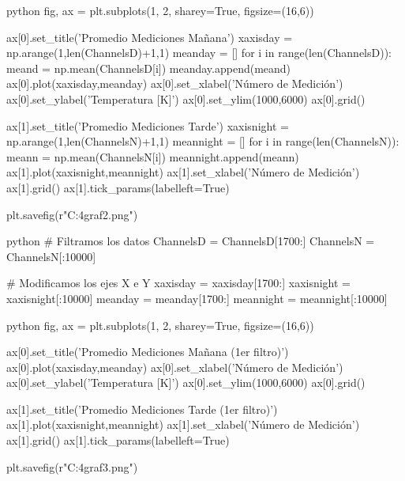 \begin{sourcecode}[\label{codigo-python}]{python}
fig, ax = plt.subplots(1, 2, sharey=True, figsize=(16,6))

ax[0].set_title('Promedio Mediciones Mañana')
xaxisday = np.arange(1,len(ChannelsD)+1,1)
meanday = []
for i in range(len(ChannelsD)):
    meand = np.mean(ChannelsD[i])
    meanday.append(meand)
ax[0].plot(xaxisday,meanday)
ax[0].set_xlabel('Número de Medición')
ax[0].set_ylabel('Temperatura [K]')
ax[0].set_ylim(1000,6000)
ax[0].grid()

ax[1].set_title('Promedio Mediciones Tarde')
xaxisnight = np.arange(1,len(ChannelsN)+1,1)
meannight = []
for i in range(len(ChannelsN)):
    meann = np.mean(ChannelsN[i])
    meannight.append(meann)
ax[1].plot(xaxisnight,meannight)
ax[1].set_xlabel('Número de Medición')
ax[1].grid()
ax[1].tick_params(labelleft=True)

plt.savefig(r"C:\Users\Usuario\Downloads\inf4graf2.png")
\end{sourcecode}

\begin{sourcecode}[\label{codigo-python}]{python}
# Filtramos los datos
ChannelsD = ChannelsD[1700:]
ChannelsN = ChannelsN[:10000]

# Modificamos los ejes X e Y
xaxisday = xaxisday[1700:]
xaxisnight = xaxisnight[:10000]
meanday = meanday[1700:]
meannight = meannight[:10000]
\end{sourcecode}

\begin{sourcecode}[\label{codigo-python}]{python}
fig, ax = plt.subplots(1, 2, sharey=True, figsize=(16,6))

ax[0].set_title('Promedio Mediciones Mañana (1er filtro)')
ax[0].plot(xaxisday,meanday)
ax[0].set_xlabel('Número de Medición')
ax[0].set_ylabel('Temperatura [K]')
ax[0].set_ylim(1000,6000)
ax[0].grid()

ax[1].set_title('Promedio Mediciones Tarde (1er filtro)')
ax[1].plot(xaxisnight,meannight)
ax[1].set_xlabel('Número de Medición')
ax[1].grid()
ax[1].tick_params(labelleft=True)

plt.savefig(r"C:\Users\Usuario\Downloads\inf4graf3.png")
\end{sourcecode}

